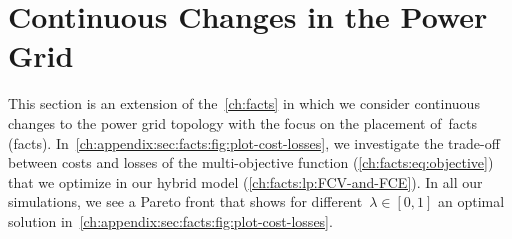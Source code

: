 \chapter{Continuous Changes in the Power Grid}
\label{ch:appendix:sec:facts:simulations}
%
This section is an extension of the~\cref{ch:facts} in which we consider
continuous changes to the power grid topology with the focus on the placement
of~\acrlong{facts} (\gls{facts}).
In~\cref{ch:appendix:sec:facts:fig:plot-cost-losses}, we investigate the
trade-off between costs and losses of the multi-objective function
(\cref{ch:facts:eq:objective}) that we optimize in our hybrid model
(\cref{ch:facts:lp:FCV-and-FCE}). In all our simulations, we see a Pareto front
that shows for different~$ \lambda \in [ 0,1 ] $ an optimal solution
in~\cref{ch:appendix:sec:facts:fig:plot-cost-losses}. 

